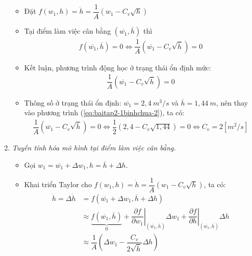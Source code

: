 \begin{enumerate}[\it a.]
\begin{itemize}
                \item Đặt $f\left({w_1, h}\right) = \dot{h} = \dfrac{1}{A} \left({w_1 - C_v\sqrt{h}}\right)$

                \item Tại điểm làm việc cân bằng $\left({\overline{w_1}, \overline{h}}\right)$ thì
                    \begin{align}
                        f\left({\overline{w_1}, \overline{h}}\right) = 0 \Longleftrightarrow \dfrac{1}{A} \left({\overline{w_1} - C_v\sqrt{\overline{h}}}\right) = 0
                    \end{align}

                \item Kết luận, phương trình động học ở trạng thái ổn định mức:
                    \begin{align} \label{eq:baitap2-1binhchua-2}
                        \dfrac{1}{A} \left({\overline{w_1} - C_v\sqrt{\overline{h}}}\right) = 0
                    \end{align}

                \item Thông số ở trạng thái ổn định: $\overline{w_1} = 2,4~m^3/s$ và $\overline{h} = 1,44~m$, nên thay vào phương trình (\ref{eq:baitap2-1binhchua-2}), ta có:
                    \begin{align}
                        \dfrac{1}{A} \left({\overline{w_1} - C_v\sqrt{\overline{h}}}\right) = 0 \Longleftrightarrow \dfrac{1}{2} \left({2,4 - C_v\sqrt{1,44}}\right) = 0 \Longleftrightarrow C_v = 2[m^2/s]
                    \end{align}
            \end{itemize}

        \item \textit{Tuyến tính hóa mô hình tại điểm làm việc cân bằng.}
            \begin{itemize}
                \item Gọi $w_1 = \overline{w_1} + \Delta w_1, h = \overline{h} + \Delta h$.

                \item Khai triển Taylor cho $f \left({w_1, h}\right) = \dot{h} = \dfrac{1}{A} \left({w_1 - C_v\sqrt{h}}\right)$, ta có:
                    \begin{align}
                        \dot{h} = \Delta \dot{h} & = f\left({\overline{w_1} + \Delta w_1, \overline{h} + \Delta h}\right) \\
                        & \approx \underbrace{f \left({\overline{w_1}, \overline{h}}\right)}_{0} + \left.\dfrac{\partial f}{\partial w_1}\right|_{\left({\overline{w_1}, \overline{h}}\right)} \Delta w_1 + \left.\dfrac{\partial f}{\partial h}\right|_{\left({\overline{w_1}, \overline{h}}\right)} \Delta h\\
                        & \approx \dfrac{1}{A} \left({\Delta w_1 - \dfrac{C_v}{2 \sqrt{\overline{h}}} \Delta h}\right)
                    \end{align}


\end{itemize}
\end{enumerate}
